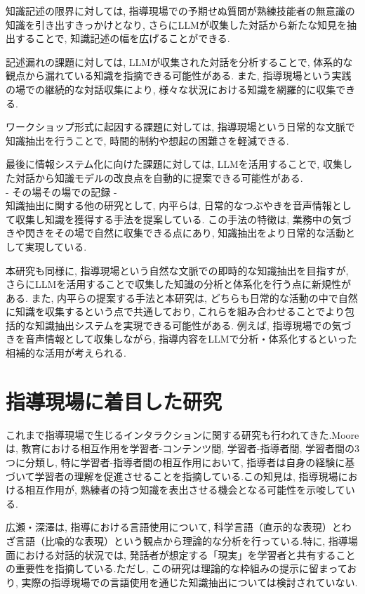 知識記述の限界に対しては, 指導現場での予期せぬ質問が熟練技能者の無意識の知識を引き出すきっかけとなり, さらにLLMが収集した対話から新たな知見を抽出することで, 知識記述の幅を広げることができる. 

記述漏れの課題に対しては, LLMが収集された対話を分析することで, 体系的な観点から漏れている知識を指摘できる可能性がある. また, 指導現場という実践の場での継続的な対話収集により, 様々な状況における知識を網羅的に収集できる.

ワークショップ形式に起因する課題に対しては, 指導現場という日常的な文脈で知識抽出を行うことで, 時間的制約や想起の困難さを軽減できる. 

最後に情報システム化に向けた課題に対しては, LLMを活用することで, 収集した対話から知識モデルの改良点を自動的に提案できる可能性がある.\\

- その場その場での記録 -\\
知識抽出に関する他の研究として, 内平ら\cite{Uchihira2022}は, 日常的なつぶやきを音声情報として収集し知識を獲得する手法を提案している. この手法の特徴は, 業務中の気づきや閃きをその場で自然に収集できる点にあり, 知識抽出をより日常的な活動として実現している.  

本研究も同様に, 指導現場という自然な文脈での即時的な知識抽出を目指すが, さらにLLMを活用することで収集した知識の分析と体系化を行う点に新規性がある. また, 内平らの提案する手法と本研究は, どちらも日常的な活動の中で自然に知識を収集するという点で共通しており, これらを組み合わせることでより包括的な知識抽出システムを実現できる可能性がある. 例えば, 指導現場での気づきを音声情報として収集しながら, 指導内容をLLMで分析・体系化するといった相補的な活用が考えられる.\\



\section{指導現場に着目した研究}
これまで指導現場で生じるインタラクションに関する研究も行われてきた.Moore\cite{Moore1989}は, 教育における相互作用を学習者-コンテンツ間, 学習者-指導者間, 学習者間の3つに分類し, 特に学習者-指導者間の相互作用において, 指導者は自身の経験に基づいて学習者の理解を促進させることを指摘している.この知見は, 指導現場における相互作用が, 熟練者の持つ知識を表出させる機会となる可能性を示唆している.

広瀬・深澤\cite{Hirose2018}は, 指導における言語使用について, 科学言語（直示的な表現）とわざ言語（比喩的な表現）という観点から理論的な分析を行っている.特に, 指導場面における対話的状況では, 発話者が想定する「現実」を学習者と共有することの重要性を指摘している.ただし, この研究は理論的な枠組みの提示に留まっており, 実際の指導現場での言語使用を通じた知識抽出については検討されていない.

